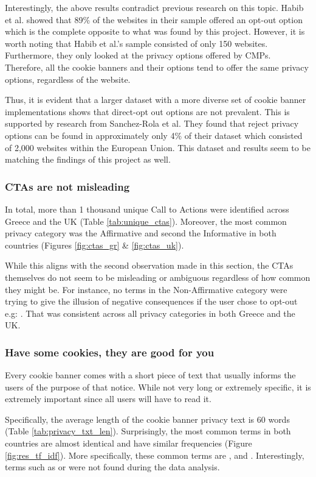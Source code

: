 \documentclass[../main.tex]{subfiles}
\begin{document}
Interestingly, the above results contradict previous research on this topic. Habib et al. \cite{habib2019empirical} showed that 89\% of the websites in their sample offered an opt-out option which is the complete opposite to what was found by this project. However, it is worth noting that Habib et al.’s sample consisted of only 150 websites. Furthermore, they only looked at the privacy options offered by CMPs. Therefore, all the cookie banners and their options tend to offer the same privacy options, regardless of the website. 

Thus, it is evident that a larger dataset with a more diverse set of cookie banner implementations shows that direct-opt out options are not prevalent. This is supported by research from Sanchez-Rola et al. \cite{sanchez2019can} They found that reject privacy options can be found in approximately only 4\% of their dataset which consisted of 2,000 websites within the European Union. This dataset and results seem to be matching the findings of this project as well. 

\subsubsection{CTAs are not misleading}
In total, more than 1 thousand unique Call to Actions were identified across Greece and the UK (Table \ref{tab:unique_ctas}). Moreover, the most common privacy category was the Affirmative and second the Informative in both countries (Figures \ref{fig:ctas_gr} \& \ref{fig:ctas_uk}).

While this aligns with the second observation made in this section, the CTAs themselves do not seem to be misleading or ambiguous regardless of how common they might be. For instance, no terms in the Non-Affirmative category were trying to give the illusion of negative consequences if the user chose to opt-out e.g: . That was consistent across all privacy categories in both Greece and the UK. 

\subsubsection{Have some cookies, they are good for you}
Every cookie banner comes with a short piece of text that usually informs the users of the purpose of that notice. While not very long or extremely specific, it is extremely important since all users will have to read it. 

Specifically, the average length of the cookie banner privacy text is 60 words (Table \ref{tab:privacy_txt_len}). Surprisingly, the most common terms in both countries are almost identical and have similar frequencies (Figure \ref{fig:res_tf_idf}). More specifically, these common terms are ,  and . Interestingly, terms such as  or  were not found during the data analysis. 
\end{document}
